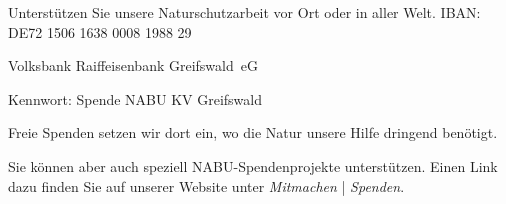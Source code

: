 
%

Unterstützen Sie unsere Naturschutzarbeit vor Ort oder in aller Welt.
\vfill
IBAN: DE72 1506 1638 0008 1988 29 

Volksbank Raiffeisenbank 
Greifswald~eG

Kennwort: Spende NABU KV Greifswald

Freie Spenden setzen wir dort ein, wo die Natur unsere Hilfe dringend benötigt. 

Sie können aber auch speziell NABU-Spendenprojekte unterstützen. Einen Link dazu finden Sie auf unserer Website 
unter \textit{Mitmachen} | \textit{Spenden}.
